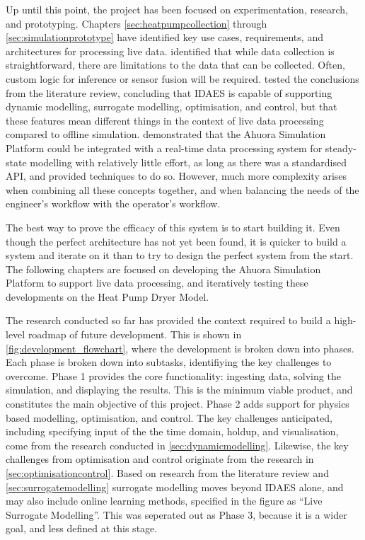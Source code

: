 \documentclass[12pt]{report}
\begin{document}
Up until this point, the project has been focused on experimentation, research, and prototyping. Chapters \ref{sec:heatpumpcollection} through \ref{sec:simulationprototype} have identified key use cases, requirements, and architectures for processing live data. 
 identified that while data collection is straightforward, there are limitations to the data that can be collected. Often, custom logic for inference or sensor fusion will be required.  tested the conclusions from the literature review, concluding that IDAES is capable of supporting dynamic modelling, surrogate modelling, optimisation, and control, but that these features mean different things in the context of live data processing compared to offline simulation.  demonstrated that the Ahuora Simulation Platform could be integrated with a real-time data processing system for steady-state modelling with relatively little effort, as long as there was a standardised API, and provided techniques to do so. However, much more complexity arises when combining all these concepts together, and when balancing the needs of the engineer's workflow with the operator's workflow.

The best way to prove the efficacy of this system is to start building it. Even though the perfect architecture has not yet been found, it is quicker to build a system and iterate on it than to try to design the perfect system from the start. The following chapters are focused on developing the Ahuora Simulation Platform to support live data processing, and iteratively testing these developments on the Heat Pump Dryer Model.

The research conducted so far has provided the context required to build a high-level roadmap of future development. This is shown in \cref{fig:development_flowchart}, where the development is broken down into phases. Each phase is broken down into subtasks, identifiying the key challenges to overcome.
Phase 1 provides the core functionality: ingesting data, solving the simulation, and displaying the results. This is the minimum viable product, and constitutes the main objective of this project. Phase 2 adds support for physics based modelling, optimisation, and control. The key challenges anticipated, including specifying input of the the time domain, holdup, and visualisation, come from the research conducted in \cref{sec:dynamicmodelling}. Likewise, the key challenges from optimisation and control originate from the research in \cref{sec:optimisationcontrol}. Based on research from the literature review and \cref{sec:surrogatemodelling} surrogate modelling moves beyond IDAES alone, and may also include online learning methods, specified in the figure as ``Live Surrogate Modelling''. This was seperated out as Phase 3, because it is a wider goal, and less defined at this stage. 
\end{document}
